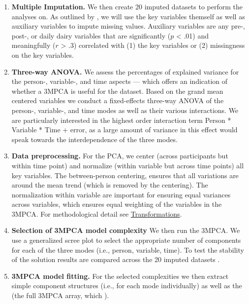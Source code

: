 \documentclass[]{article}
\providecommand{\tightlist}{%
\setlength{\itemsep}{0pt}\setlength{\parskip}{0pt}}
\begin{document}
\begin{enumerate}
\def\labelenumi{\arabic{enumi}.}
\setcounter{enumi}{2}
\tightlist
\item
  \textbf{Multiple Imputation.} We then create 20 imputed datasets to
  perform the analyses on. As outlined by \citet{Monden2015}, we will
  use the key variables themself as well as auxiliary variables to
  impute missing values. Auxiliary variables are any pre-, post-, or
  daily dairy variables that are significantly (\(p\) \textless{} .01)
  and meaningfully (\(r\) \textgreater{} .3) correlated with (1) the key
  variables or (2) missingness on the key variables.
\item
  \textbf{Three-way ANOVA.} We assess the percentages of explained
  variance for the person-, variable-, and time aspects --- which offers
  an indication of whether a 3MPCA is useful for the dataset. Based on
  the grand mean centered variables we conduct a fixed-effects three-way
  ANOVA of the person-, variable-, and time modes as well as their
  various interactions. We are particularly interested in the highest
  order interaction term Person * Variable * Time + error, as a large
  amount of variance in this effect would speak towards the
  interdependence of the three modes.
\item
  \textbf{Data preprocessing.} For the PCA, we
  center (across participants but within time point) and normalize
  (within variable but across time points) all key variables. The
  between-person centering, ensures that all variations are around the
  mean trend (which is removed by the centering). The normalization
  within variable are important for ensuring equal variances across
  variables, which ensures equal weighting of the variables in the
  3MPCA. For methodological detail see
  \protect\hyperlink{transformations}{Transformations}.
\item
  \textbf{Selection of 3MPCA model complexity} We then run the 3MPCA. We
  use a generalized scree plot to select the appropriate number of
  components for each of the three modes (i.e., person, variable, time).
  To test the stability of the solution results are compared across the
  20 imputed datasets .
\item
  \textbf{3MPCA model fitting.} For the selected complexities we then
  extract simple component structures (i.e., for each mode individually)
  as well as the  (the full 3MPCA array,
  which
  ).

\end{enumerate}
\end{document}
